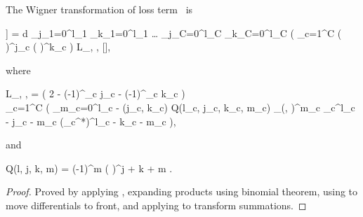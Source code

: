 \begin{theorem}
\label{thm:transformations:w-losses}
    The Wigner transformation of loss term~ is
    \begin{eqn*}
\fl    	{} \left[ \int d\xvec \hat{\mathcal{L}}_{\lvec} [\hat{A}] \right]
    	= \int d\xvec
    		\sum_{j_1=0}^{l_1} \sum_{k_1=0}^{l_1} \ldots
    		\sum_{j_C=0}^{l_C} \sum_{k_C=0}^{l_C}
    			\left(
    				\prod_{c=1}^C
    					\left(  \right)^{j_c}
    					\left(  \right)^{k_c}
    			\right)
    			L_{\lvec, \jvec, \kvec}
    		[],
    \end{eqn*}
    where
    \begin{eqn*}
\fl    	L_{\lvec, \jvec, \kvec}
    	= \left( 2 - (-1)^{\sum_c j_c} - (-1)^{\sum_c k_c} \right) \\
    		\prod_{c=1}^C \left(
    			\sum_{m_c=0}^{l_c - \max(j_c, k_c)}
    			Q(l_c, j_c, k_c, m_c)
    			\delta_{\restbasis}(\xvec, \xvec)^{m_c}
    			\Psi_c^{l_c - j_c - m_c}
    			(\Psi_c^*)^{l_c - k_c - m_c}
    		\right),
    \end{eqn*}
    and
    \begin{eqn*}
        Q(l, j, k, m)
    	= (-1)^m \left(  \right)^{j + k + m}
    		.
    \end{eqn*}
\end{theorem}
\begin{proof}
Proved by applying , expanding products using binomial theorem, using  to move differentials to front, and applying  to transform summations.
\end{proof}
